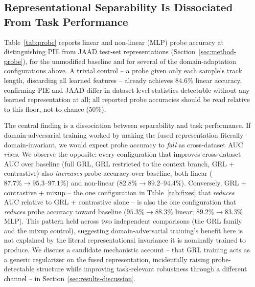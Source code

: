 \subsection{Representational Separability Is Dissociated From Task Performance}
\label{sec:results-probe}

Table~\ref{tab:probe} reports linear and non-linear (MLP) probe
accuracy at distinguishing PIE from JAAD test-set representations
(Section~\ref{sec:method-probe}), for the unmodified baseline and for
several of the domain-adaptation configurations above. A trivial
control -- a probe given only each sample's track length, discarding
all learned features -- already achieves $84.6\%$ linear accuracy,
confirming PIE and JAAD differ in dataset-level statistics detectable
without any learned representation at all; all reported probe
accuracies should be read relative to this floor, not to chance
($50\%$).

The central finding is a dissociation between separability and task
performance. If domain-adversarial training worked by making the fused
representation literally domain-invariant, we would expect probe
accuracy to \emph{fall} as cross-dataset AUC \emph{rises}. We observe
the opposite: every configuration that improves cross-dataset AUC over
baseline (full GRL, GRL restricted to the context branch, GRL +
contrastive) also \emph{increases} probe accuracy over baseline, both
linear ($87.7\% \to 95.3$--$97.1\%$) and non-linear
($82.8\% \to 89.2$--$94.4\%$). Conversely, GRL + contrastive + mixup --
the one configuration in Table~\ref{tab:fixes} that \emph{reduces} AUC
relative to GRL + contrastive alone -- is also the one configuration
that \emph{reduces} probe accuracy toward baseline ($95.3\%\to88.3\%$
linear; $89.2\%\to83.3\%$ MLP). This pattern held across two
independent comparisons (the GRL family and the mixup control),
suggesting domain-adversarial training's benefit here is not explained
by the literal representational invariance it is nominally trained to
produce. We discuss a candidate mechanistic account -- that GRL
training acts as a generic regularizer on the fused representation,
incidentally raising probe-detectable structure while improving
task-relevant robustness through a different channel -- in
Section~\ref{sec:results-discussion}.

